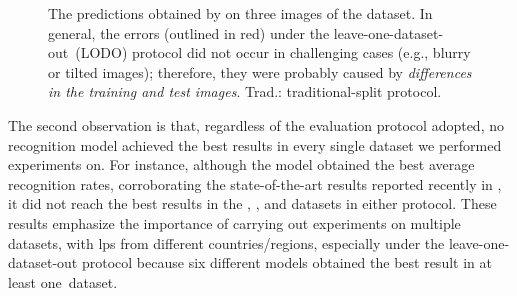 \begin{figure}[!htb]
    \centering
    
	
    \caption{The predictions obtained by \trba on three images of the \aolp dataset. In general, the errors (outlined in red) under the leave-one-dataset-out~(LODO) protocol did not occur in challenging cases (e.g., blurry or tilted images); therefore, they were probably caused by \emph{differences in the training and test images}. Trad.: traditional-split protocol.}
    \label{fig:samples-errors-aolp}
\end{figure}

The second observation is that, regardless of the evaluation protocol adopted, no recognition model achieved the best results in every single dataset we performed experiments on.
For instance, although the \crnet model obtained the best average recognition rates, corroborating the state-of-the-art results reported recently in \citep{laroca2021efficient,silva2022flexible}, it did not reach the best results in the \chineselp, \aolp, \ssigsegplate and \dataset datasets in either protocol.
These results emphasize the importance of carrying out experiments on multiple datasets, with \glspl*{lp} from different countries/regions, especially under the leave-one-dataset-out protocol because six different models obtained the best result in at least one~dataset.

